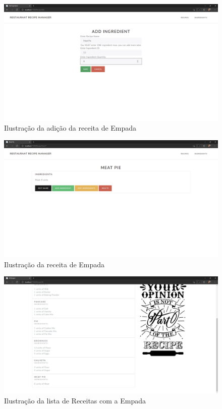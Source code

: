 \FloatBarrier
\begin{figure}[!hbt]
    \centering
    \includegraphics[width=14cm]{Resources/WebApp/Recipes/recipe (13).png}
    \caption{Ilustração da adição da receita de Empada}
    
\end{figure}
\FloatBarrier
\begin{figure}[!hbt]
    \centering
    \includegraphics[width=14cm]{Resources/WebApp/Recipes/recipe (14).png}
    \caption{Ilustração da receita de Empada}
    
\end{figure}
\FloatBarrier
\begin{figure}[!hbt]
    \centering
    \includegraphics[width=14cm]{Resources/WebApp/Recipes/recipe (15).png}
    \caption{Ilustração da lista de Receitas com a Empada}
    
\end{figure}
